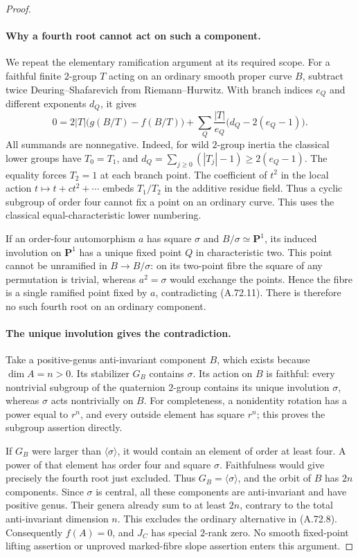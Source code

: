 \begin{proof}
\paragraph{Why a fourth root cannot act on such a component.}
We repeat the elementary ramification argument at its required
scope. For a faithful finite \(2\)-group \(T\) acting on an
ordinary smooth proper curve \(B\), subtract twice
Deuring--Shafarevich from Riemann--Hurwitz. With branch indices
\(e_Q\) and different exponents \(d_Q\), it gives
\[
 0=2|T|\bigl(g(B/T)-f(B/T)\bigr)
      +\sum_Q\frac{|T|}{e_Q}
                         \bigl(d_Q-2(e_Q-1)\bigr).
                                                        \tag{A.72.11}
\]
All summands are nonnegative. Indeed, for wild \(2\)-group
inertia the classical lower groups have \(T_0=T_1\), and
\(d_Q=\sum_{j\ge0}(|T_j|-1)\ge2(e_Q-1)\).
The equality forces \(T_2=1\) at each branch point. The
coefficient of \(t^2\) in the local action
\(t\mapsto t+c t^2+\cdots\) embeds \(T_1/T_2\) in the
additive residue field. Thus a cyclic subgroup of order four
cannot fix a point on an ordinary curve. This uses the
classical equal-characteristic lower numbering.
\cite[\S2.2, equation (3) and Exercise 2.12(c)]{fghBouwWewers}

If an order-four automorphism \(a\) has square \(\sigma\)
and \(B/\sigma\simeq\mathbf P^1\), its induced involution
on \(\mathbf P^1\) has a unique fixed point \(Q\) in
characteristic two. This point cannot be unramified in
\(B\to B/\sigma\): on its two-point fibre the square of
any permutation is trivial, whereas \(a^2=\sigma\) would
exchange the points. Hence the fibre is a single ramified
point fixed by \(a\), contradicting (A.72.11). There is
therefore no such fourth root on an ordinary component.

\paragraph{The unique involution gives the contradiction.}
Take a positive-genus anti-invariant component \(B\), which
exists because \(\dim A=n>0\). Its stabilizer \(G_B\)
contains \(\sigma\). Its action on \(B\) is faithful:
every nontrivial subgroup of the quaternion \(2\)-group
contains its unique involution \(\sigma\), whereas
\(\sigma\) acts nontrivially on \(B\).
For completeness, a nonidentity rotation has a power equal
to \(r^n\), and every outside element has square \(r^n\);
this proves the subgroup assertion directly.

If \(G_B\) were larger than \(\langle\sigma\rangle\),
it would contain an element of order at least four. A power
of that element has order four and square \(\sigma\).
Faithfulness would give precisely the fourth root just
excluded. Thus \(G_B=\langle\sigma\rangle\), and the
orbit of \(B\) has \(2n\) components. Since \(\sigma\)
is central, all these components are anti-invariant and
have positive genus. Their genera already sum to at least
\(2n\), contrary to the total anti-invariant dimension \(n\).
This excludes the ordinary alternative in (A.72.8).
Consequently \(f(A)=0\), and \(J_C\) has special
\(2\)-rank zero. No smooth fixed-point lifting assertion
or unproved marked-fibre slope assertion enters this argument.


\end{proof}
